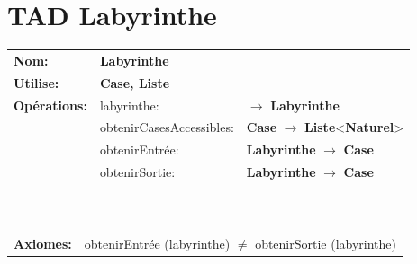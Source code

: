 \documentclass[a4paper,11pt]{report}
\begin{document}
%
%
\fontsize{14pt}{18pt}
\selectfont

\section*{TAD Labyrinthe}

\noindent\begin{tabular}{lll}
    \textbf{Nom:} & \textbf{Labyrinthe} & \\
    \textbf{Utilise:} & \textbf{Case, Liste} & \\
    \textbf{Opérations:} & labyrinthe: & $\to$ \textbf{Labyrinthe}\\
     & obtenirCasesAccessibles: & \textbf{Case} $\to$ \textbf{Liste}<\textbf{Naturel}>\\
     & obtenirEntrée: & \textbf{Labyrinthe} $\to$ \textbf{Case}\\
     & obtenirSortie: & \textbf{Labyrinthe} $\to$ \textbf{Case}\\
     & & \\
    \end{tabular}\\
\begin{tabular}{ll}
    \textbf{Axiomes:} & obtenirEntrée (labyrinthe) $\neq$ obtenirSortie (labyrinthe)
\end{tabular}
\end{document}
